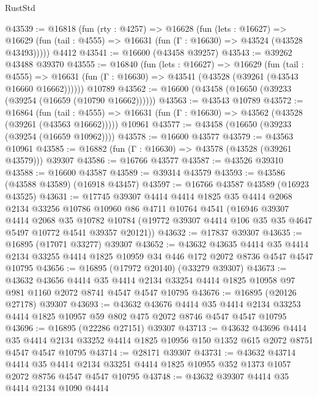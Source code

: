\begin{lexlean}{RustStd}
\begin{coremodule}
{\begin{coremodule}
{{{{{{{{{{{{{{{{{{{{{{{{{{{{{{{{{{{{{{{{{{{{{{{{{{{{{{{@43539 := @16818
    (fun (rty : @4257) =>
    @16628
      (fun (lets : @16627) =>
      @16629 (fun (tail : @4555) => @16631 (fun (Γ : @16630) => @43524 (@43528 @43493)))))
    @4412
@43541 := @16600 (@43458 @39257)
@43543 := @39262 @43488 @39370
@43555 := @16840
    (fun (lets : @16627) =>
    @16629
      (fun (tail : @4555) =>
      @16631 (fun (Γ : @16630) => @43541 (@43528 (@39261 (@43543 @16660 @16662))))))
    @10789
@43562 := @16600 (@43458 (@16650 (@39233 (@39254 (@16659 (@10790 @16662))))))
@43563 := @43543 @10789
@43572 := @16864
    (fun (tail : @4555) => @16631 (fun (Γ : @16630) => @43562 (@43528 (@39261 (@43563 @16662)))))
    @10961
@43577 := @43458 (@16650 (@39233 (@39254 (@16659 @10962))))
@43578 := @16600 @43577
@43579 := @43563 @10961
@43585 := @16882 (fun (Γ : @16630) => @43578 (@43528 (@39261 @43579))) @39307
@43586 := @16766 @43577
@43587 := @43526 @39310
@43588 := @16600 @43587
@43589 := @39314 @43579
@43593 := @43586 (@43588 @43589) (@16918 @43457)
@43597 := @16766 @43587 @43589 (@16923 @43525)
@43631 := @17745
    @39307
    @4414
    @4414
    @1825
    @35
    @4414
    @2068
    @2134
    @33256
    @10786
    @10960
    @86
    @4711
    @10764
    @4541
    (@16946
      @39307
      @4414
      @2068
      @35
      @10782
      @10784
      (@19772 @39307 @4414 @106 @35 @35 @4647 @5497 @10772 @4541 @39357 @20121))
@43632 := @17837 @39307
@43635 := @16895 (@17071 @33277) @39307
@43652 := @43632
    @43635
    @4414
    @35
    @4414
    @2134
    @33255
    @4414
    @1825
    @10959
    @34
    @446
    @172
    @2072
    @8736
    @4547
    @4547
    @10795
@43656 := @16895 (@17972 @20140) (@33279 @39307)
@43673 := @43632
    @43656
    @4414
    @35
    @4414
    @2134
    @33254
    @4414
    @1825
    @10958
    @97
    @981
    @1160
    @2072
    @8741
    @4547
    @4547
    @10795
@43676 := @16895 (@20126 @27178) @39307
@43693 := @43632
    @43676
    @4414
    @35
    @4414
    @2134
    @33253
    @4414
    @1825
    @10957
    @59
    @802
    @475
    @2072
    @8746
    @4547
    @4547
    @10795
@43696 := @16895 (@22286 @27151) @39307
@43713 := @43632
    @43696
    @4414
    @35
    @4414
    @2134
    @33252
    @4414
    @1825
    @10956
    @150
    @1352
    @615
    @2072
    @8751
    @4547
    @4547
    @10795
@43714 := @28171 @39307
@43731 := @43632
    @43714
    @4414
    @35
    @4414
    @2134
    @33251
    @4414
    @1825
    @10955
    @352
    @1373
    @1057
    @2072
    @8756
    @4547
    @4547
    @10795
@43748 := @43632
    @39307
    @4414
    @35
    @4414
    @2134
    @1090
    @4414
}}}}}}}}}}}}}}}}}}}}}}}}}}}}}}}}}}}}}}}}}}}}}}}}}}}}}}}
\end{coremodule}}
\end{coremodule}
\end{lexlean}
